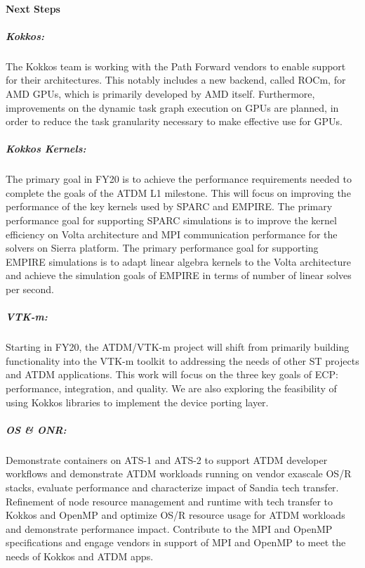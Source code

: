 \paragraph{Next Steps}


\subparagraph{Kokkos: } The Kokkos team is working with the Path Forward vendors to enable support for their architectures.
This notably includes a new backend, called ROCm, for AMD GPUs, which is primarily developed by AMD itself.
Furthermore, improvements on the dynamic task graph execution on GPUs are planned, in order to reduce the task granularity necessary to make effective use for GPUs.

\subparagraph{Kokkos Kernels:} The primary goal in FY20 is to achieve the performance requirements needed to complete the goals of the ATDM L1 milestone. This will focus on improving the performance of the key kernels used by SPARC and EMPIRE. The primary performance goal for supporting SPARC simulations is to improve the kernel efficiency on Volta architecture and MPI communication performance for the solvers on Sierra platform.  The primary performance goal for supporting EMPIRE simulations is to adapt linear algebra kernels to the Volta architecture and achieve the simulation goals of EMPIRE in terms of number of linear solves per second.
 
\subparagraph{VTK-m:} Starting in FY20, the ATDM/VTK-m project will shift from primarily building functionality into the VTK-m toolkit to addressing the needs of other ST projects and ATDM applications. This work will focus on the three key goals of ECP: performance, integration, and quality. We are also exploring the feasibility of using Kokkos libraries to implement the device porting layer. 

\subparagraph{OS \& ONR:} Demonstrate containers on ATS-1 and ATS-2 to support ATDM developer workflows and demonstrate ATDM workloads running on vendor exascale OS/R stacks, evaluate performance and characterize impact of Sandia tech transfer. Refinement of node resource management and runtime with tech transfer to Kokkos and OpenMP and optimize OS/R resource usage for ATDM workloads and demonstrate performance impact. Contribute to the MPI and OpenMP specifications and engage vendors in support of MPI and OpenMP to meet the needs of Kokkos and ATDM apps.
